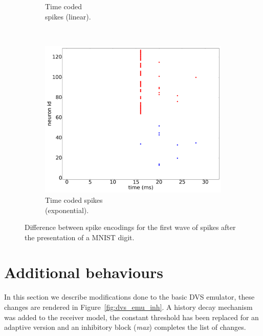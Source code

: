 \documentclass[conference]{IEEEtran}
\begin{document}
\begin{figure}[hbt]
\begin{subfigure}[b]{0.32\textwidth}
    \caption{Time coded\\spikes (linear).}
    \label{fig:time_spikes}
  \end{subfigure}~
  \begin{subfigure}[b]{0.32\textwidth}
    \includegraphics[width=\textwidth]{time_exp_coded_-8x8-_cycle_0}
    \caption{Time coded spikes \\(exponential).}
    \label{fig:time_exp_spikes}
  \end{subfigure}
  
  \caption{Difference between spike encodings for the first wave of spikes after the presentation of a MNIST digit.}
  \label{fig:spike_codes}
\end{figure}

\section{Additional behaviours}
\label{sec:additional-behaviours}
In this section we describe modifications done to the basic DVS emulator, these changes are rendered in Figure~\ref{fig:dvs_emu_inh}. A history decay mechanism was added to the receiver model, the constant threshold has been replaced for an adaptive version and an inhibitory block (\textit{\textsf{max}}) completes the list of changes.
\end{document}
